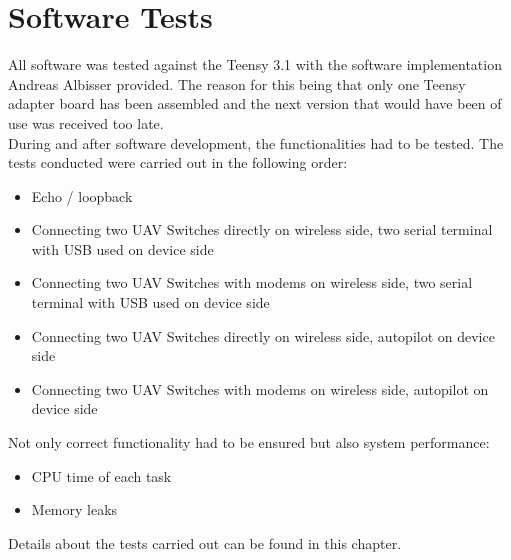 \section{Software Tests}
All software was tested against the Teensy 3.1 with the software implementation Andreas Albisser provided. The reason for this being that only one Teensy adapter board has been assembled and the next version that would have been of use was received too late.\\
During and after software development, the functionalities had to be tested. The tests conducted were carried out in the following order:
\begin{itemize}
    \item Echo / loopback
    \item Connecting two UAV Switches directly on wireless side, two serial terminal with USB used on device side
    \item Connecting two UAV Switches with modems on wireless side, two serial terminal with USB used on device side
    \item Connecting two UAV Switches directly on wireless side, autopilot on device side
    \item Connecting two UAV Switches with modems on wireless side, autopilot on device side
\end{itemize}
Not only correct functionality had to be ensured but also system performance:
\begin{itemize}
    \item CPU time of each task
    \item Memory leaks
\end{itemize}
Details about the tests carried out can be found in this chapter.
%
%
%

